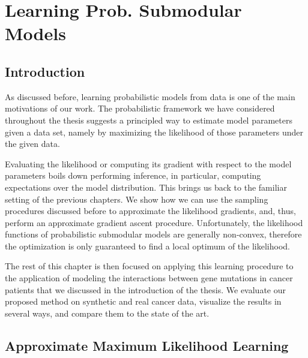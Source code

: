 \chapter{Learning Prob. Submodular Models} \label{ch:genes}

\section{Introduction}
As discussed before, learning probabilistic models from data is one of the main motivations of our work.
The probabilistic framework we have considered throughout the thesis suggests a principled way to estimate model parameters given a data set, namely by maximizing the likelihood of those parameters under the given data.

Evaluating the likelihood or computing its gradient with respect to the model parameters boils down performing inference, in particular, computing expectations over the model distribution.
This brings us back to the familiar setting of the previous chapters.
We show how we can use the sampling procedures discussed before to approximate the likelihood gradients, and, thus, perform an approximate gradient ascent procedure.
Unfortunately, the likelihood functions of probabilistic submodular models are generally non-convex, therefore the optimization is only guaranteed to find a local optimum of the likelihood.

The rest of this chapter is then focused on applying this learning procedure to the application of modeling the interactions between gene mutations in cancer patients that we discussed in the introduction of the thesis.
We evaluate our proposed method on synthetic and real cancer data, visualize the results in several ways, and compare them to the state of the art.

\section{Approximate Maximum Likelihood Learning} \label{sect:ml}

